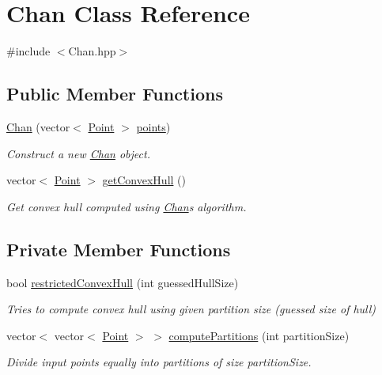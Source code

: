 \hypertarget{classChan}{}\section{Chan Class Reference}
\label{classChan}


{\ttfamily \#include $<$Chan.\+hpp$>$}

\subsection*{Public Member Functions}
\begin{DoxyCompactItemize}
\item 
\mbox{\hyperlink{classChan_a0b17366e6548967ea27702d9ae37f394}{Chan}} (vector$<$ \mbox{\hyperlink{classPoint}{Point}} $>$ \mbox{\hyperlink{classChan_a3c867cd91392509f20644fc59d73778c}{points}})
\begin{DoxyCompactList}\small\item\em Construct a new \mbox{\hyperlink{classChan}{Chan}} object. \end{DoxyCompactList}\item 
vector$<$ \mbox{\hyperlink{classPoint}{Point}} $>$ \mbox{\hyperlink{classChan_a1382d15aa44de4e9182f2cc74cbf1dea}{get\+Convex\+Hull}} ()
\begin{DoxyCompactList}\small\item\em Get convex hull computed using \mbox{\hyperlink{classChan}{Chan}}\textquotesingle{}s algorithm. \end{DoxyCompactList}\end{DoxyCompactItemize}
\subsection*{Private Member Functions}
\begin{DoxyCompactItemize}
\item 
bool \mbox{\hyperlink{classChan_a3a7eb4017718654b6f7f13daaef90534}{restricted\+Convex\+Hull}} (int guessed\+Hull\+Size)
\begin{DoxyCompactList}\small\item\em Tries to compute convex hull using given partition size (guessed size of hull) \end{DoxyCompactList}\item 
vector$<$ vector$<$ \mbox{\hyperlink{classPoint}{Point}} $>$ $>$ \mbox{\hyperlink{classChan_a767dbe606a11c923d4effd7250529900}{compute\+Partitions}} (int partition\+Size)
\begin{DoxyCompactList}\small\item\em Divide input points equally into partitions of size \textquotesingle{}partition\+Size\textquotesingle{}. \end{DoxyCompactList}\end{DoxyCompactItemize}
